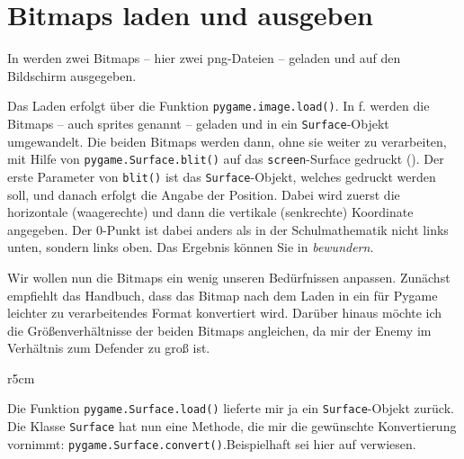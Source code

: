 \newpage
\section{Bitmaps laden und ausgeben}\label{secBitmapLaden}


In  werden zwei Bitmaps -- hier zwei png-Dateien -- geladen und auf den Bildschirm ausgegeben. 

Das Laden erfolgt über die Funktion \texttt{pygame.image.load()}. In f. werden die Bitmaps -- auch \glspl{sprite} genannt -- geladen und in ein \texttt{Surface}-Objekt umgewandelt. Die beiden Bitmaps werden dann, ohne sie weiter zu verarbeiten, mit Hilfe von \texttt{pygame.Sur\-face.\-blit()} auf das \texttt{screen}-Surface gedruckt (). Der erste Parameter von \texttt{blit()} ist das \texttt{Surface}-Objekt, welches gedruckt werden soll, und danach erfolgt die Angabe der Position. Dabei wird zuerst die horizontale (waagerechte) und dann die vertikale (senkrechte) Koordinate angegeben. Der 0-Punkt ist dabei anders als in der Schulmathematik nicht links unten, sondern links oben. Das Ergebnis können Sie in  \emph{bewundern}.


Wir wollen nun die Bitmaps ein wenig unseren Bedürfnissen anpassen. Zunächst empfiehlt das Handbuch, dass das Bitmap nach dem Laden in ein für Pygame leichter zu verarbeitendes Format konvertiert wird. Darüber hinaus möchte ich die Größenverhältnisse der beiden Bitmaps angleichen, da mir der Enemy im Verhältnis zum Defender zu groß ist. 


\begin{wrapfigure}[9]{r}{5cm}%
    \vspace{-1em}%
\end{wrapfigure}%
Die Funktion \texttt{pygame.Surface.load()} lieferte mir ja ein \texttt{Surface}-Objekt zurück. Die Klasse \texttt{Surface} hat nun eine Methode, die mir die gewünschte Konvertierung vornimmt: \texttt{pygame.Surface.convert()}.\label{pageTransparenz}Beispielhaft sei hier auf  verwiesen. 

